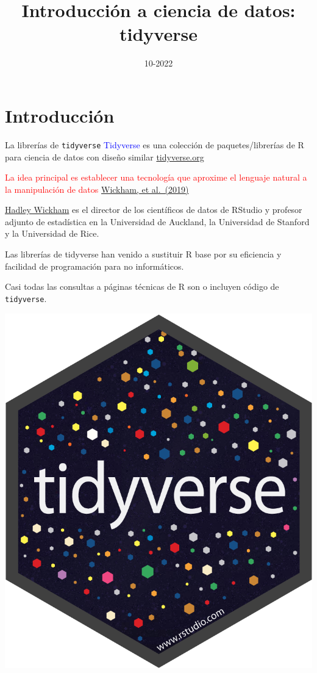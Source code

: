 \documentclass[
  ignorenonframetext,
  aspectratio=169]{beamer}
\title{Introducción a ciencia de datos: tidyverse}
\author{}
\date{\vspace{-2.5em}10-2022}
\newcommand\blue[1]{\textcolor{blue}{#1}}
\newcommand\red[1]{\textcolor{red}{#1}}
\begin{document}
\frame{\titlepage}

\begin{frame}[allowframebreaks]
  \tableofcontents[hideallsubsections]
\end{frame}
\hypertarget{introducciuxf3n}{%
\section{Introducción}\label{introducciuxf3n}}

\begin{frame}[fragile]{La librerías de \texttt{tidyverse}}
\protect\hypertarget{la-libreruxedas-de-tidyverse}{}
\blue{Tidyverse} es una colección de paquetes/librerías de R para
ciencia de datos con diseño similar
\href{https://www.tidyverse.org/}{tidyverse.org}

\red{ La idea principal es establecer una tecnología que aproxime el lenguaje natural a la manipulación de datos}
\href{https://joss.theoj.org/papers/10.21105/joss.01686}{Wickham, et
al.~(2019)}

\href{https://hadley.nz/}{Hadley Wickham} es el director de los
científicos de datos de RStudio y profesor adjunto de estadística en la
Universidad de Auckland, la Universidad de Stanford y la Universidad de
Rice.

Las librerías de tidyverse han venido a sustituir R base por su
eficiencia y facilidad de programación para no informáticos.

Casi todas las consultas a páginas técnicas de R son o incluyen código
de \texttt{tidyverse}.

\begin{flushright}\includegraphics[width=0.1\linewidth]{Imgs/hex-tidyverse} \end{flushright}
\end{frame}
\end{document}
